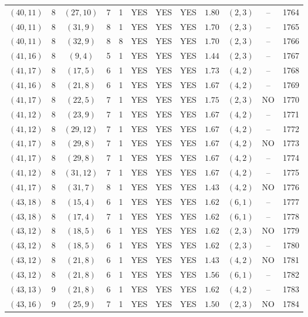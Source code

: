 \begin{longtable}{|c|c|c|c|c|c|c|c|c|c|c|c|}
$(40,11)$ & 8 & $(27,10)$ & 7 & 1 & YES & YES & YES & $1.80$ & $(2,3)$ & -- & 1764\\
$(40,11)$ & 8 & $(31,9)$ & 8 & 1 & YES & YES & YES & $1.70$ & $(2,3)$ & -- & 1765\\
$(40,11)$ & 8 & $(32,9)$ & 8 & 8 & YES & YES & YES & $1.70$ & $(2,3)$ & -- & 1766\\
$(41,16)$ & 8 & $(9,4)$ & 5 & 1 & YES & YES & YES & $1.44$ & $(2,3)$ & -- & 1767\\
$(41,17)$ & 8 & $(17,5)$ & 6 & 1 & YES & YES & YES & $1.73$ & $(4,2)$ & -- & 1768\\
$(41,16)$ & 8 & $(21,8)$ & 6 & 1 & YES & YES & YES & $1.67$ & $(4,2)$ & -- & 1769\\
$(41,17)$ & 8 & $(22,5)$ & 7 & 1 & YES & YES & YES & $1.75$ & $(2,3)$ & NO & 1770\\
$(41,12)$ & 8 & $(23,9)$ & 7 & 1 & YES & YES & YES & $1.67$ & $(4,2)$ & -- & 1771\\
$(41,12)$ & 8 & $(29,12)$ & 7 & 1 & YES & YES & YES & $1.67$ & $(4,2)$ & -- & 1772\\
$(41,17)$ & 8 & $(29,8)$ & 7 & 1 & YES & YES & YES & $1.67$ & $(4,2)$ & NO & 1773\\
$(41,17)$ & 8 & $(29,8)$ & 7 & 1 & YES & YES & YES & $1.67$ & $(4,2)$ & -- & 1774\\
$(41,12)$ & 8 & $(31,12)$ & 7 & 1 & YES & YES & YES & $1.67$ & $(4,2)$ & -- & 1775\\
$(41,17)$ & 8 & $(31,7)$ & 8 & 1 & YES & YES & YES & $1.43$ & $(4,2)$ & NO & 1776\\
$(43,18)$ & 8 & $(15,4)$ & 6 & 1 & YES & YES & YES & $1.62$ & $(6,1)$ & -- & 1777\\
$(43,18)$ & 8 & $(17,4)$ & 7 & 1 & YES & YES & YES & $1.62$ & $(6,1)$ & -- & 1778\\
$(43,12)$ & 8 & $(18,5)$ & 6 & 1 & YES & YES & YES & $1.62$ & $(2,3)$ & NO & 1779\\
$(43,12)$ & 8 & $(18,5)$ & 6 & 1 & YES & YES & YES & $1.62$ & $(2,3)$ & -- & 1780\\
$(43,12)$ & 8 & $(21,8)$ & 6 & 1 & YES & YES & YES & $1.43$ & $(4,2)$ & NO & 1781\\
$(43,12)$ & 8 & $(21,8)$ & 6 & 1 & YES & YES & YES & $1.56$ & $(6,1)$ & -- & 1782\\
$(43,13)$ & 9 & $(21,8)$ & 6 & 1 & YES & YES & YES & $1.62$ & $(4,2)$ & -- & 1783\\
$(43,16)$ & 9 & $(25,9)$ & 7 & 1 & YES & YES & YES & $1.50$ & $(2,3)$ & NO & 1784\\

\end{longtable}
